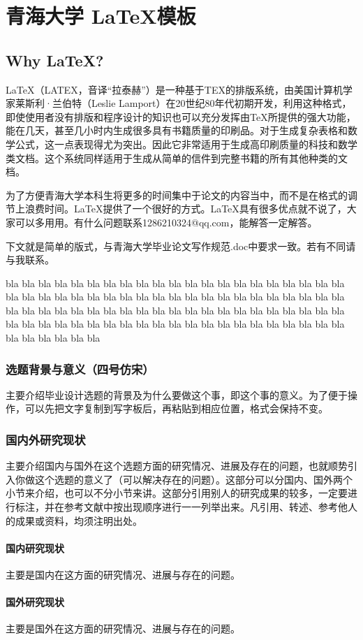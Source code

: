 \chapter{青海大学 \LaTeX 模板}
\section{Why \LaTeX ? }
\LaTeX（LATEX，音译“拉泰赫”）是一种基于TEX的排版系统，由美国计算机学家莱斯利·兰伯特（Leslie Lamport）在20世纪80年代初期开发，利用这种格式，即使使用者没有排版和程序设计的知识也可以充分发挥由\TeX{}所提供的强大功能，能在几天，甚至几小时内生成很多具有书籍质量的印刷品。对于生成复杂表格和数学公式，这一点表现得尤为突出。因此它非常适用于生成高印刷质量的科技和数学类文档。这个系统同样适用于生成从简单的信件到完整书籍的所有其他种类的文档。

为了方便青海大学本科生将更多的时间集中于论文的内容当中，而不是在格式的调节上浪费时间。\LaTeX 提供了一个很好的方式。\LaTeX 具有很多优点就不说了，大家可以多用用。有什么问题联系1286210324@qq.com，能解答一定解答。
\par 下文就是简单的版式，与青海大学毕业论文写作规范.doc中要求一致。若有不同请与我联系。

bla bla bla bla bla bla bla bla bla bla bla bla bla bla bla bla bla bla bla bla bla bla bla bla bla bla bla bla bla bla bla bla bla bla bla bla bla bla bla bla bla bla bla bla bla bla bla bla bla bla bla bla bla bla bla bla bla bla bla bla bla bla bla bla bla bla bla bla bla bla bla bla bla bla bla bla bla bla bla bla bla bla bla bla bla bla bla bla bla bla

\subsection{选题背景与意义（四号仿宋）}
主要介绍毕业设计选题的背景及为什么要做这个事，即这个事的意义。为了便于操作，可以先把文字复制到写字板后，再粘贴到相应位置，格式会保持不变。
\subsection{国内外研究现状}
主要介绍国内与国外在这个选题方面的研究情况、进展及存在的问题，也就顺势引入你做这个选题的意义了（可以解决存在的问题）。这部分可以分国内、国外两个小节来介绍，也可以不分小节来讲。这部分引用别人的研究成果的较多，一定要进行标注，并在参考文献中按出现顺序进行一一列举出来。凡引用、转述、参考他人的成果或资料，均须注明出处。
\subsubsection{国内研究现状}
主要是国内在这方面的研究情况、进展与存在的问题。
\subsubsection{国外研究现状}
主要是国外在这方面的研究情况、进展与存在的问题。
